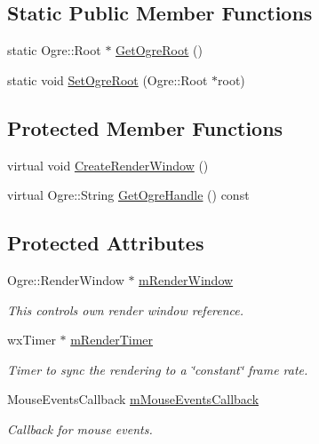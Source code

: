 \subsection*{Static Public Member Functions}
\begin{DoxyCompactItemize}
\item 
static Ogre\+::\+Root $\ast$ \mbox{\hyperlink{classwx_ogre_render_window_abe184803840b348854303163f116d267}{Get\+Ogre\+Root}} ()
\item 
static void \mbox{\hyperlink{classwx_ogre_render_window_adbd1dc0de7ed468785eeb0cae1239210}{Set\+Ogre\+Root}} (Ogre\+::\+Root $\ast$root)
\end{DoxyCompactItemize}
\subsection*{Protected Member Functions}
\begin{DoxyCompactItemize}
\item 
virtual void \mbox{\hyperlink{classwx_ogre_render_window_ad052d7c0accd57b25ac52f5e50df0b62}{Create\+Render\+Window}} ()
\item 
virtual Ogre\+::\+String \mbox{\hyperlink{classwx_ogre_render_window_ab855c41487a9b8154be824ff91260f90}{Get\+Ogre\+Handle}} () const
\end{DoxyCompactItemize}
\subsection*{Protected Attributes}
\begin{DoxyCompactItemize}
\item 
Ogre\+::\+Render\+Window $\ast$ \mbox{\hyperlink{classwx_ogre_render_window_a9b78f7b7ebccb68b2fd9f30a40bff5a7}{m\+Render\+Window}}
\begin{DoxyCompactList}\small\item\em This control\textquotesingle{}s own render window reference. \end{DoxyCompactList}\item 
wx\+Timer $\ast$ \mbox{\hyperlink{classwx_ogre_render_window_a2e1a04499bead763eb9e1cc4477bc643}{m\+Render\+Timer}}
\begin{DoxyCompactList}\small\item\em Timer to sync the rendering to a \char`\"{}constant\char`\"{} frame rate. \end{DoxyCompactList}\item 
Mouse\+Events\+Callback \mbox{\hyperlink{classwx_ogre_render_window_ac118411b88d49b1df4218d003520f22d}{m\+Mouse\+Events\+Callback}}
\begin{DoxyCompactList}\small\item\em Callback for mouse events. \end{DoxyCompactList}\end{DoxyCompactItemize}
